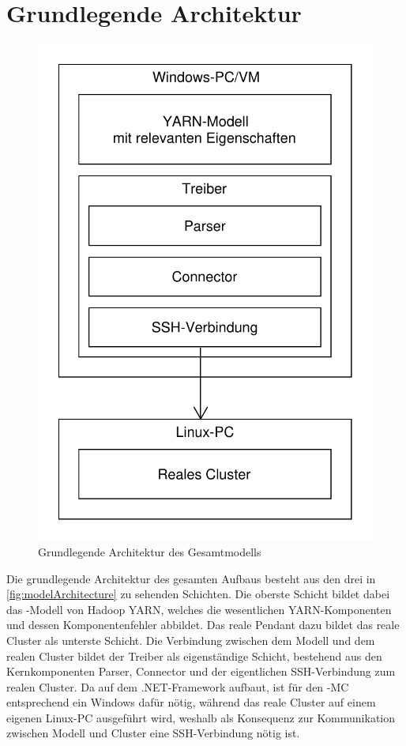 \section{Grundlegende Architektur}\label{sec:architecture}

\begin{figure}
	\centering
	\includegraphics[width=0.5\columnwidth]{./images/modelArchitecture.pdf}
	\caption{Grundlegende Architektur des Gesamtmodells}
	\label{fig:modelArchitecture}
\end{figure}

Die grundlegende Architektur des gesamten Aufbaus besteht aus den drei in \autoref{fig:modelArchitecture} zu sehenden Schichten. Die oberste Schicht bildet dabei das \sS-Modell von Hadoop YARN, welches die wesentlichen YARN-Komponenten und dessen Komponentenfehler abbildet. Das reale Pendant dazu bildet das reale Cluster als unterste Schicht. Die Verbindung zwischen dem Modell und dem realen Cluster bildet der Treiber als eigenständige Schicht, bestehend aus den Kernkomponenten Parser, Connector und der eigentlichen SSH-Verbindung zum realen Cluster. Da \sS auf dem .NET-Framework aufbaut, ist für den \sS-MC entsprechend ein Windows dafür nötig, während das reale Cluster auf einem eigenen Linux-PC ausgeführt wird, weshalb als Konsequenz zur Kommunikation zwischen Modell und Cluster eine SSH-Verbindung nötig ist.